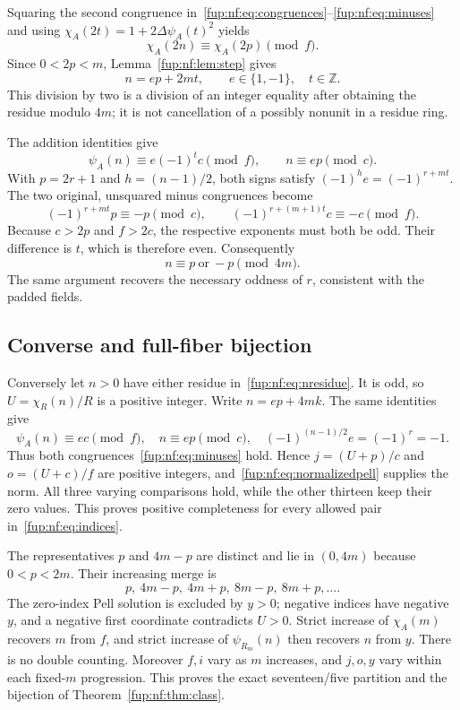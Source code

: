 \documentclass[11pt,letterpaper]{article}
\theoremstyle{definition}\newtheorem{definition}[theorem]{Definition}
\theoremstyle{remark}\newtheorem{remark}[theorem]{Remark}
\newcommand{\Z}{\mathbb Z}\newcommand{\Np}{\mathbb Z_{>0}}
\begin{document}
Squaring the second congruence in~\eqref{fup:nf:eq:congruences}--\eqref{fup:nf:eq:minuses} and using $\chi_A(2t)=1+2\Delta\psi_A(t)^2$ yields
\[
 \chi_A(2n)\equiv\chi_A(2p)\pmod f.
\]
Since $0<2p<m$, Lemma~\ref{fup:nf:lem:step} gives
\begin{equation}\label{fup:nf:eq:halfresidue}
 n=e p+2mt,\qquad e\in\{1,-1\},\quad t\in\Z.
\end{equation}
This division by two is a division of an integer equality after obtaining the residue modulo $4m$; it is not cancellation of a possibly nonunit in a residue ring.

The addition identities give
\[
 \psi_A(n)\equiv e(-1)^t c\pmod f,
 \qquad n\equiv e p\pmod c.
\]
With $p=2r+1$ and $h=(n-1)/2$, both signs satisfy
$(-1)^he=(-1)^{r+mt}$. The two original, unsquared minus congruences become
\[
 (-1)^{r+mt}p\equiv-p\pmod c,
 \qquad(-1)^{r+(m+1)t}c\equiv-c\pmod f.
\]
Because $c>2p$ and $f>2c$, the respective exponents must both be odd. Their difference is $t$, which is therefore even. Consequently
\begin{equation}\label{fup:nf:eq:nresidue}
 n\equiv p\ \text{or}\ -p\pmod{4m}.
\end{equation}
The same argument recovers the necessary oddness of $r$, consistent with the padded fields.

\subsection{Converse and full-fiber bijection}
Conversely let $n>0$ have either residue in~\eqref{fup:nf:eq:nresidue}. It is odd, so $U=\chi_R(n)/R$ is a positive integer. Write $n=e p+4mk$. The same identities give
\[
 \psi_A(n)\equiv e c\pmod f,\quad n\equiv e p\pmod c,
 \quad (-1)^{(n-1)/2}e=(-1)^r=-1.
\]
Thus both congruences~\eqref{fup:nf:eq:minuses} hold. Hence $j=(U+p)/c$ and $o=(U+c)/f$ are positive integers, and~\eqref{fup:nf:eq:normalizedpell} supplies the norm. All three varying comparisons hold, while the other thirteen keep their zero values. This proves positive completeness for every allowed pair in~\eqref{fup:nf:eq:indices}.

The representatives $p$ and $4m-p$ are distinct and lie in $(0,4m)$ because $0<p<2m$. Their increasing merge is
\[
 p,\ 4m-p,\ 4m+p,\ 8m-p,\ 8m+p,\ldots.
\]
The zero-index Pell solution is excluded by $y>0$; negative indices have negative $y$, and a negative first coordinate contradicts $U>0$. Strict increase of $\chi_A(m)$ recovers $m$ from $f$, and strict increase of $\psi_{R_m}(n)$ then recovers $n$ from $y$. There is no double counting. Moreover $f,i$ vary as $m$ increases, and $j,o,y$ vary within each fixed-$m$ progression. This proves the exact seventeen/five partition and the bijection of Theorem~\ref{fup:nf:thm:class}.
\end{document}
